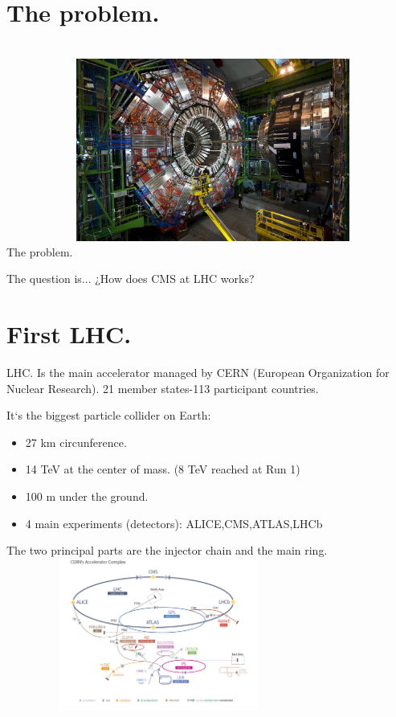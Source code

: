 \documentclass[8pt]{beamer}
\begin{document}
\section{The problem.}
\begin{frame}[fragile]{The problem.}
\centering
\includegraphics[height=7cm,width=9cm]{1}
\begin{exampleblock}{\centering The question is...}
\centering
¿How does CMS at LHC works?

\end{exampleblock}


\end{frame}

\section{First LHC.}


\begin{frame}[fragile]{LHC.}
Is the main accelerator managed by CERN (European Organization for Nuclear Research). 
21 member states-113 participant countries.

It`s the biggest particle collider on Earth:
\begin{itemize}
	\item 27 km circunference.
	\item 14 TeV at the center of mass. (8 TeV reached at Run 1)
	\item 100 m under the ground.
	\item 4 main experiments (detectors): ALICE,CMS,ATLAS,LHCb
\end{itemize}
The two principal parts are the injector chain and the main ring.
\includegraphics[height=5cm,width=10cm]{2}
\end{frame}
\end{document}
